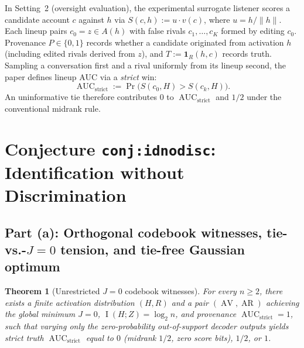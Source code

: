 \documentclass[11pt]{article}
\theoremstyle{plain}
\newtheorem{theorem}{Theorem}
\theoremstyle{definition}
\theoremstyle{remark}
\DeclareMathOperator{\AUC}{AUC}
\DeclareMathOperator{\AV}{AV}
\DeclareMathOperator{\AR}{AR}
\DeclareMathOperator{\MI}{I}
\begin{document}
In Setting~2 (oversight evaluation), the experimental surrogate listener scores a candidate account $c$ against $h$ via $S(c, h) := u \cdot v(c)$, where $u = h/\|h\|$. Each lineup pairs $c_0 = z \in A(h)$ with false rivals $c_1, \dots, c_K$ formed by editing $c_0$. Provenance $P \in \{0, 1\}$ records whether a candidate originated from activation $h$ (including edited rivals derived from $z$), and $T := \mathbf{1}_R(h, c)$ records truth. Sampling a conversation first and a rival uniformly from its lineup second, the paper defines lineup AUC via a \emph{strict} win:
\[
\AUC_{\mathrm{strict}} := \Pr\bigl(S(c_0, H) > S(c_k, H)\bigr).
\]
An uninformative tie therefore contributes $0$ to $\AUC_{\mathrm{strict}}$ and $1/2$ under the conventional midrank rule.

\section{Conjecture \texttt{conj:idnodisc}: Identification without Discrimination}

\subsection{Part (a): Orthogonal codebook witnesses, tie-vs.-\texorpdfstring{$J=0$}{J=0} tension, and tie-free Gaussian optimum}

\begin{theorem}[Unrestricted $J = 0$ codebook witnesses]\label{thm:codebook}
For every $n \ge 2$, there exists a finite activation distribution $(H, R)$ and a pair $(\AV, \AR)$ achieving the global minimum $J = 0$, $\MI(H; Z) = \log_2 n$, and provenance $\AUC_{\mathrm{strict}} = 1$, such that varying only the zero-probability out-of-support decoder outputs yields strict truth $\AUC_{\mathrm{strict}}$ equal to $0$ (midrank $1/2$, zero score bits), $1/2$, or $1$.
\end{theorem}
\end{document}
